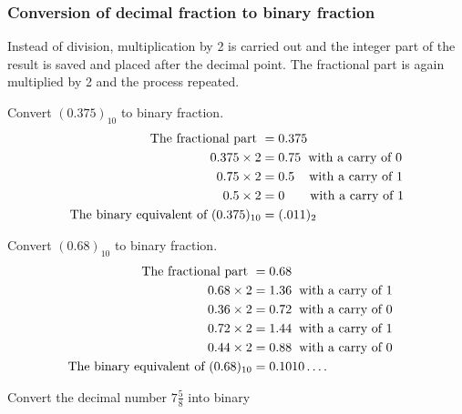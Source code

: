 \subsubsection{Conversion of decimal fraction to binary 
	fraction}
Instead of division, multiplication by 2 is carried out and the integer part of the result is saved and placed after the decimal point. The fractional part is again multiplied by 2 and the process repeated.
\begin{exercise}
	Convert $(0.375)_{10}$ to binary fraction.
	\begin{align*}
	\text{The fractional part } &=0.375\\
	0.375 \times 2&=0.75 \hspace{0.2cm} \text{with a carry of  0}\\
	0.75 \times 2&=0.5 \hspace{0.4cm} \text{with a carry of  1}\\
	0.5 \times 2&=0 \hspace{0.7cm} \text{with a carry of  1}\\
	\text{The binary equivalent of } (0.375)_{10}&=(.011)_{2}
	\end{align*}
\end{exercise}
\begin{exercise}
	Convert $( 0.68)_{10}$ to binary fraction.
	\begin{align*}
	\text{The fractional part } &=0.68\\
	0.68 \times  2&=1.36  \hspace{0.2cm} \text{with a carry of  1}\\
	0.36 \times 2&=0.72  \hspace{0.2cm} \text{with a carry of  0}\\
	0.72 \times 2&=1.44  \hspace{0.2cm} \text{with a carry of  1}\\
	0.44 \times 2&=0.88  \hspace{0.2cm} \text{with a carry of  0}\\
	\text{The binary equivalent of } (0.68)_{10}&=0.1010 \ldots .
	&	\end{align*}
\end{exercise}
\begin{exercise}
	Convert the decimal number $7\frac{5}{8}$ into binary 
\end{exercise}
